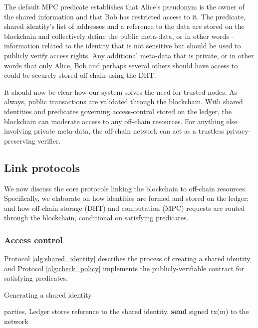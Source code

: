 \documentclass{article} \usepackage{nips13submit_e,times}
\begin{document}
The default MPC predicate establishes that Alice's pseudonym is the owner of the shared information and that Bob has restricted access to it. The predicate, shared identity's list of addresses and a reference to the data are stored on the blockchain and collectively define the public meta-data, or in other words - information related to the identity that is not sensitive but should be used to publicly verify access rights. Any additional meta-data that is private, or in other words that only Alice, Bob and perhaps several others should have access to could be securely stored off-chain using the DHT.

It should now be clear how our system solves the need for trusted nodes. As always, public transactions are validated through the blockchain. With shared identities and predicates governing access-control stored on the ledger, the blockchain can moderate access to any off-chain resources. For anything else involving private meta-data, the off-chain network can act as a trustless privacy-preserving verifier.

\subsection{Link protocols}

We now discuss the core protocols linking the blockchain to off-chain resources. Specifically, we elaborate on how identities are formed and stored on the ledger; and how off-chain storage (DHT) and computation (MPC) requests are routed through the blockchain, conditional on satisfying predicates.

\subsubsection{Access control}

Protocol \ref{alg:shared_identity} describes the process of creating a shared identity and Protocol \ref{alg:check_policy} implements the publicly-verifiable contract for satisfying predicates.

\begin{algorithm}
\caption{Generating a shared identity}\label{alg:shared_identity}
\begin{algorithmic}
\Require  parties, 
\Ensure Ledger  stores reference to the shared identity.
\State 
\State 
\For{}
	\State 
\State 
	\State 
\EndFor
\State 
\State \textbf{send} signed tx(m) to the network\\
	\State 
\EndProcedure
\end{algorithmic}
\end{algorithm}
\end{document}
